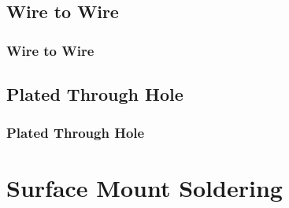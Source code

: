 \documentclass{beamer}
\begin{document}
\subsection{Wire to Wire}
\begin{frame}[t]
	\frametitle{Wire to Wire}
\end{frame}

\subsection{Plated Through Hole}
\begin{frame}[t]
	\frametitle{Plated Through Hole}
\end{frame}

\section{Surface Mount Soldering}
\end{document}
